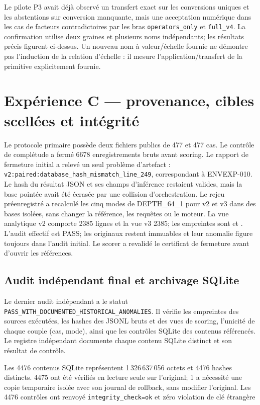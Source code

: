 \documentclass[11pt,a4paper]{article}
\begin{document}
Le pilote P3 avait déjà observé un transfert exact sur les conversions uniques et les abstentions sur conversion manquante, mais une acceptation numérique dans les cas de facteurs contradictoires par les bras \texttt{operators\_only} et \texttt{full\_v4}. La confirmation utilise deux graines et plusieurs noms indépendants; les résultats précis figurent ci-dessus. Un nouveau nom à valeur/échelle fournie ne démontre pas l’induction de la relation d’échelle : il mesure l’application/transfert de la primitive explicitement fournie.

\section{Expérience C — provenance, cibles scellées et intégrité}

Le protocole primaire possède deux fichiers publics de 477 et 477 cas. Le contrôle de complétude a fermé 6678 enregistrements bruts avant scoring. Le rapport de fermeture initial a relevé un seul problème d’artefact : \texttt{v2:paired:database\_hash\_mismatch\_line\_249}, correspondant à ENVEXP-010. Le hash du résultat JSON et ses champs d’inférence restaient valides, mais la base pointée avait été écrasée par une collision d’orchestration. Le rejeu préenregistré a recalculé les cinq modes de DEPTH\_64\_1 pour v2 et v3 dans des bases isolées, sans changer la référence, les requêtes ou le moteur.
La vue analytique v2 comporte 2385 lignes et la vue v3 2385; les empreintes sont \texttt{} et \texttt{}. L’audit effectif est PASS; les originaux restent immuables et leur anomalie figure toujours dans l’audit initial. Le scorer a revalidé le certificat de fermeture avant d’ouvrir les références.

\subsection{Audit indépendant final et archivage SQLite}
Le dernier audit indépendant a le statut \texttt{PASS\_WITH\_DOCUMENTED\_HISTORICAL\_ANOMALIES}. Il vérifie les empreintes des sources exécutées, les hashes des JSONL bruts et des vues de scoring, l’unicité de chaque couple (cas, mode), ainsi que les contrôles SQLite des contenus référencés. Le registre indépendant documente chaque contenu SQLite distinct et son résultat de contrôle.

Les 4476 contenus SQLite représentent 1\,326\,637\,056 octets et 4476 hashes distincts. 4475 ont été vérifiés en lecture seule sur l’original; 1 a nécessité une copie temporaire isolée avec son journal de rollback, sans modifier l’original. Les 4476 contrôles ont renvoyé \texttt{integrity\_check=ok} et zéro violation de clé étrangère
\end{document}

